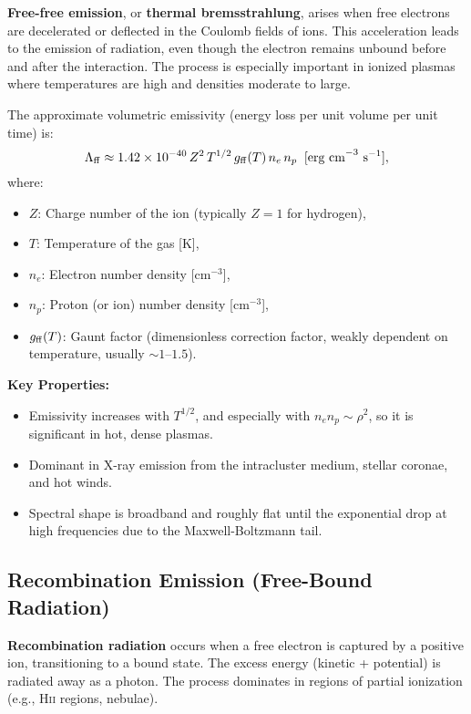 \textbf{Free-free emission}, or \textbf{thermal bremsstrahlung}, arises when free electrons are decelerated or deflected in the Coulomb fields of ions. This acceleration leads to the emission of radiation, even though the electron remains unbound before and after the interaction. The process is especially important in ionized plasmas where temperatures are high and densities moderate to large.

The approximate volumetric emissivity (energy loss per unit volume per unit time) is:
\[
\Lambda_{\rm ff} \approx 1.42 \times 10^{-40} \, Z^2 \, T^{1/2} \, g_{\rm ff}(T) \, n_e \, n_p \;\; \text{[erg cm}^{-3}\text{ s}^{-1}\text{]},
\]
where:
\begin{itemize}
    \item \( Z \): Charge number of the ion (typically \( Z = 1 \) for hydrogen),
    \item \( T \): Temperature of the gas [K],
    \item \( n_e \): Electron number density [cm\(^{-3}\)],
    \item \( n_p \): Proton (or ion) number density [cm\(^{-3}\)],
    \item \( g_{\rm ff}(T) \): Gaunt factor (dimensionless correction factor, weakly dependent on temperature, usually \( \sim 1 \text{–} 1.5 \)).
\end{itemize}

\textbf{Key Properties:}
\begin{itemize}
    \item Emissivity increases with \( T^{1/2} \), and especially with \( n_e n_p \sim \rho^2 \), so it is significant in hot, dense plasmas.
    \item Dominant in X-ray emission from the intracluster medium, stellar coronae, and hot winds.
    \item Spectral shape is broadband and roughly flat until the exponential drop at high frequencies due to the Maxwell-Boltzmann tail.
\end{itemize}


\subsection{Recombination Emission (Free-Bound Radiation)}

\textbf{Recombination radiation} occurs when a free electron is captured by a positive ion, transitioning to a bound state. The excess energy (kinetic + potential) is radiated away as a photon. The process dominates in regions of partial ionization (e.g., H\textsc{ii} regions, nebulae).

